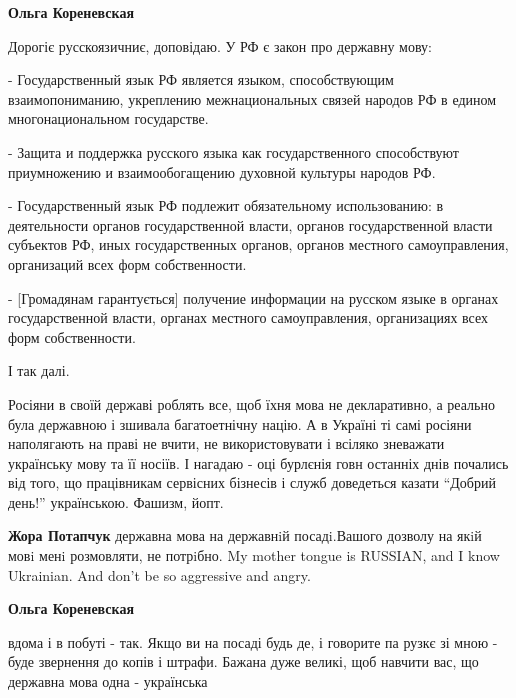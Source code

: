 \begin{itemize}

\textbf{Ольга Кореневская} 

Дорогіє русскоязичниє, доповідаю. У РФ є закон про державну мову:

- Государственный язык РФ является языком, способствующим взаимопониманию, укреплению межнациональных связей народов РФ в едином многонациональном государстве.

- Защита и поддержка русского языка как государственного способствуют
приумножению и взаимообогащению духовной культуры народов РФ.

- Государственный язык РФ подлежит обязательному использованию: в деятельности органов государственной власти, органов государственной власти субъектов РФ, иных государственных органов, органов местного самоуправления, организаций всех форм собственности.

- [Громадянам гарантується] получение информации на русском языке в органах
государственной власти, органах местного самоуправления, организациях всех форм
собственности.

І так далі.

Росіяни в своїй державі роблять все, щоб їхня мова не декларативно, а реально
була державною і зшивала багатоетнічну націю. А в Україні ті самі росіяни
наполягають на праві не вчити, не використовувати і всіляко зневажати
українську мову та її носіїв. І нагадаю - оці бурлєнія говн останніх днів
почались від того, що працівникам сервісних бізнесів і служб доведеться казати
\enquote{Добрий день!} українською. Фашизм, йопт.


\textbf{Жора Потапчук} державна мова на державнiй посадi.Вашого дозволу на якiй
мовi менi розмовляти, не потрiбно. My mother tongue is RUSSIAN, and I know
Ukrainian. And don't be so aggressive and angry.



\textbf{Ольга Кореневская} 

вдома і в побуті - так. Якщо ви на посаді будь де, і
говорите па рузкє зі мною - буде звернення до копів і штрафи. Бажана дуже
великі, щоб навчити вас, що державна мова одна - українська




\end{itemize}
